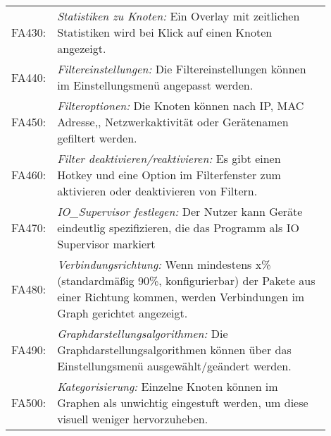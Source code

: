 \begin{tabular}{lp{0.9\linewidth}}

FA430: & \textit{Statistiken zu Knoten: }Ein Overlay mit zeitlichen Statistiken wird bei Klick auf einen Knoten angezeigt. \\

FA440: & \textit{Filtereinstellungen: }Die Filtereinstellungen können im Einstellungsmenü angepasst werden. \\

FA450: & \textit{Filteroptionen: }Die Knoten können nach IP, MAC Adresse,, Netzwerkaktivität oder Gerätenamen gefiltert werden. \\

FA460: & \textit{Filter deaktivieren/reaktivieren: }Es gibt einen Hotkey und eine Option im Filterfenster zum aktivieren oder deaktivieren von Filtern. \\

FA470: & \textit{IO\_Supervisor festlegen: }Der Nutzer kann Geräte eindeutlig spezifizieren, die das Programm als IO Supervisor markiert \\ %

FA480: & \textit{Verbindungsrichtung: }Wenn mindestens x\% (standardmäßig 90\%, konfigurierbar) der Pakete aus einer Richtung kommen, werden Verbindungen im Graph gerichtet angezeigt. \\

FA490: & \textit{Graphdarstellungsalgorithmen: }Die Graphdarstellungsalgorithmen können über das Einstellungsmenü ausgewählt/geändert werden. \\

FA500: & \textit{Kategorisierung: }Einzelne Knoten können im Graphen als unwichtig eingestuft werden, um diese visuell weniger hervorzuheben. \\
\end{tabular} 